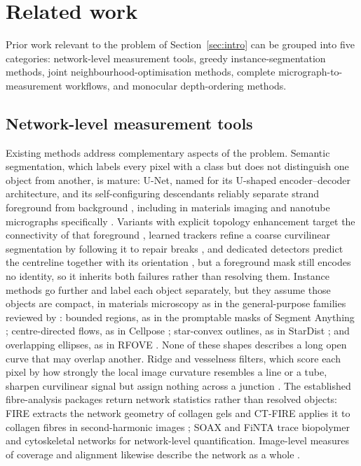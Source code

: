 \section{Related work}
\label{sec:related}

Prior work relevant to the problem of Section~\ref{sec:intro} can be
grouped into five categories: network-level measurement tools, greedy
instance-segmentation methods, joint neighbourhood-optimisation methods,
complete micrograph-to-measurement workflows, and monocular depth-ordering
methods.

\subsection{Network-level measurement tools}
\label{sec:rel-tools}

Existing methods address complementary aspects of the problem. Semantic
segmentation, which labels every pixel with a class but does not distinguish
one object from another, is mature: U-Net, named for its U-shaped
encoder--decoder architecture, and its self-configuring descendants
reliably separate strand foreground from background
\citep{ronneberger2015unet,isensee2021nnunet}, including in materials imaging
\citep{stan2020optimizing} and nanotube micrographs
specifically \citep{nguyen2023cntsegnet}. Variants with explicit topology enhancement target the
connectivity of that foreground \citep{lin2026vetunet}, learned trackers
refine a coarse curvilinear segmentation by following it to repair breaks
\citep{heng2026curvitracker}, and dedicated detectors predict the centreline
together with its orientation \citep{jiang2024centerline}, but a foreground mask
still encodes no identity, so it inherits both failures rather than resolving
them. Instance methods go further and
label each object separately, but they assume those objects are compact, in
materials microscopy \citep{he2026instance} as in the general-purpose
families reviewed by \citet{gu2022instancereview}: bounded regions, as in the
promptable masks of Segment Anything \citep{kirillov2023sam};
centre-directed flows, as in Cellpose \citep{stringer2021cellpose};
star-convex outlines, as in StarDist \citep{schmidt2018stardist}; and
overlapping ellipses, as in RFOVE \citep{panagiotakis2020rfove}. None of
these shapes describes a long open curve that may overlap another. Ridge and
vesselness filters, which score each pixel by how strongly the local image
curvature resembles a line or a tube, sharpen curvilinear signal but assign
nothing across a junction
\citep{steger1998unbiased,frangi1998vesselness}. The
established fibre-analysis packages return network statistics rather than
resolved objects: FIRE extracts the network geometry of collagen gels
\citep{stein2008fire} and CT-FIRE applies it to collagen fibres in
second-harmonic images \citep{bredfeldt2014ctfire}; SOAX
\citep{xu2015soax} and FiNTA \citep{flormann2021finta} trace biopolymer
and cytoskeletal networks for network-level quantification. Image-level measures of
coverage and alignment likewise describe the network as a whole
\citep{beigzadeh2024utilizing}.

